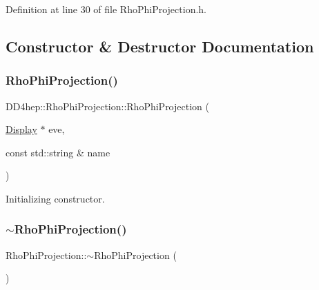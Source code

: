 Definition at line 30 of file Rho\+Phi\+Projection.\+h.



\subsection{Constructor \& Destructor Documentation}
\hypertarget{class_d_d4hep_1_1_rho_phi_projection_abe10facbc4c46e43a3854efada4c99ad}{}\label{class_d_d4hep_1_1_rho_phi_projection_abe10facbc4c46e43a3854efada4c99ad} 
\subsubsection{\texorpdfstring{Rho\+Phi\+Projection()}{RhoPhiProjection()}}
{\footnotesize\ttfamily D\+D4hep\+::\+Rho\+Phi\+Projection\+::\+Rho\+Phi\+Projection (\begin{DoxyParamCaption}\item[{\hyperlink{class_d_d4hep_1_1_display}{Display} $\ast$}]{eve,  }\item[{const std\+::string \&}]{name }\end{DoxyParamCaption})}



Initializing constructor. 

\hypertarget{class_d_d4hep_1_1_rho_phi_projection_a9dc8283aa69ce065236b29de09905b54}{}\label{class_d_d4hep_1_1_rho_phi_projection_a9dc8283aa69ce065236b29de09905b54} 
\subsubsection{\texorpdfstring{$\sim$\+Rho\+Phi\+Projection()}{~RhoPhiProjection()}}
{\footnotesize\ttfamily Rho\+Phi\+Projection\+::$\sim$\+Rho\+Phi\+Projection (\begin{DoxyParamCaption}{ }\end{DoxyParamCaption})\hspace{0.3cm}{\ttfamily [virtual]}}



